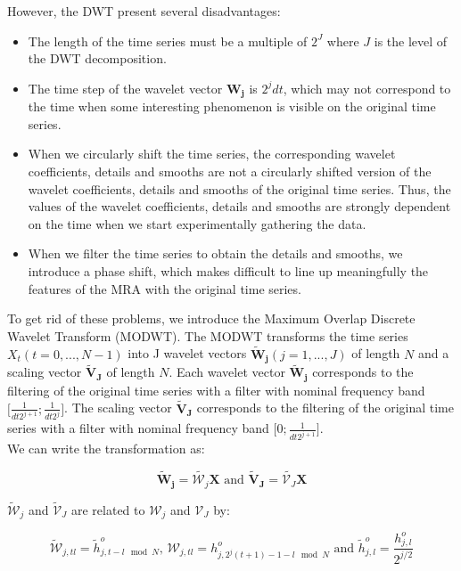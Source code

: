 \documentclass[main.tex]{subfiles}
\begin{document}
However, the DWT present several disadvantages:

\begin{itemize}
	\item The length of the time series must be a multiple of $2^J$ where $J$ is the level of the DWT decomposition.
	\item The time step of the wavelet vector $\bm{W_j}$ is $2^j dt$, which may not correspond to the time when some interesting phenomenon is visible on the original time series.
	\item When we circularly shift the time series, the corresponding wavelet coefficients, details and smooths are not a circularly shifted version of the wavelet coefficients, details and smooths of the original time series. Thus, the values of the wavelet coefficients, details and smooths are strongly dependent on the time when we start experimentally gathering the data.
	\item When we filter the time series to obtain the details and smooths, we introduce a phase shift, which makes difficult to line up meaningfully the features of the MRA with the original time series.
\end{itemize}

To get rid of these problems, we introduce the Maximum Overlap Discrete Wavelet Transform (MODWT). The MODWT transforms the time series $X_t \left( t = 0, ... , N - 1 \right)$ into J wavelet vectors $\bm{\widetilde{W}_j} \left( j = 1 , ... , J \right)$ of length $N$ and a scaling vector $\bm{\widetilde{V}_J}$ of length $N$. Each wavelet vector $\bm{\widetilde{W}_j}$ corresponds to the filtering of the original time series with a filter with nominal frequency band $\lbrack \frac{1}{dt 2^{j + 1}} ; \frac{1}{dt 2^j} \rbrack$. The scaling vector $\bm{\widetilde{V}_J}$ corresponds to the filtering of the original time series with a filter with nominal frequency band $\lbrack 0 ; \frac{1}{dt 2^{j + 1}} \rbrack$. \\

We can write the transformation as:

\begin{equation}
\bm{\widetilde{W}_j} = \widetilde{\mathcal{W}_j} \bm{X} \text{ and } \bm{\widetilde{V}_J} = \widetilde{\mathcal{V}_J} \bm{X}
\end{equation}

$ \widetilde{\mathcal{W}}_j$ and $\widetilde{\mathcal{V}}_J$ are related to $\mathcal{W}_j$ and $\mathcal{V}_J$ by:

\begin{equation}
\widetilde{\mathcal{W}}_{j, t l} = \widetilde{h}_{j , t - l \mod N}^o \text{, } \mathcal{W}_{j, t l} = h_{j , 2^j \left( t + 1 \right) - 1 - l \mod N}^o \text{ and } \widetilde{h}_{j , l}^o = \frac{h_{j , l}^o}{2^{j/2}}
\end{equation}
\end{document}
